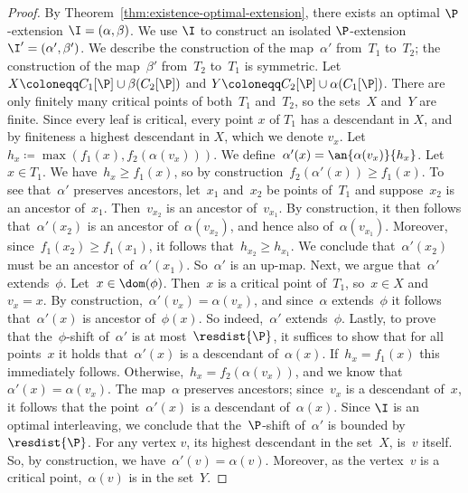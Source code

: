 \begin{proof}
By Theorem~\ref{thm:existence-optimal-extension}, there exists an optimal $\P$-extension $\I=(\alpha,\beta)$.
We use $\I$ to construct an isolated $\P$-extension $\I'=(\alpha',\beta')$.
We describe the construction of the map~$\alpha'$ from~$T_1$ to~$T_2$; the construction of the map~$\beta'$ from~$T_2$ to~$T_1$ is symmetric.
%
Let $X \coloneqq C_1[\P]\cup\beta(C_2[\P])$ and $Y \coloneqq C_2[\P] \cup \alpha(C_1[\P])$.
There are only finitely many critical points of both~$T_1$ and~$T_2$, so the sets~$X$ and~$Y$ are finite.
Since every leaf is critical, every point $x$ of $T_1$ has a descendant in $X$, and by finiteness a highest descendant in $X$, which we denote $v_x$.
Let~$h_x \coloneqq \max(f_1(x), f_2(\alpha(v_x)))$.
We define~$\alpha'(x) = \an{\alpha(v_x)}{h_x}$.
%
Let~$x \in T_1$.
We have~$h_x \ge f_1(x)$, so by construction~$f_2(\alpha'(x)) \ge f_1(x)$.
To see that~$\alpha'$ preserves ancestors, let~$x_1$ and~$x_2$ be points of~$T_1$ and suppose~$x_2$ is an ancestor of~$x_1$.
Then~$v_{x_2}$ is an ancestor of~$v_{x_1}$.
By construction, it then follows that~$\alpha'(x_2)$ is an ancestor of~$\alpha(v_{x_2})$, and hence also of~$\alpha(v_{x_1})$.
Moreover, since~$f_1(x_2) \ge f_1(x_1)$, it follows that~$h_{x_2} \ge h_{x_1}$.
We conclude that~$\alpha'(x_2)$ must be an ancestor of~$\alpha'(x_1)$.
So~$\alpha'$ is an up-map.
%
Next, we argue that~$\alpha'$ extends~$\phi$.
Let~$x \in \dom(\phi)$.
Then~$x$ is a critical point of~$T_1$, so~$x \in X$ and~$v_x = x$.
By construction,~$\alpha'(v_x) = \alpha(v_x)$, and since~$\alpha$ extends~$\phi$ it follows that~$\alpha'(x)$ is ancestor of~$\phi(x)$.
So indeed,~$\alpha'$ extends~$\phi$.
Lastly, to prove that the~$\phi$-shift of~$\alpha'$ is at most~$\resdist{\P}$, it suffices to show that for all points~$x$ it holds that~$\alpha'(x)$ is a descendant of~$\alpha(x)$.
If~$h_x = f_1(x)$ this immediately follows.
Otherwise,~$h_x = f_2(\alpha(v_x))$, and we know that~$\alpha'(x) = \alpha(v_x)$.
The map~$\alpha$ preserves ancestors; since~$v_x$ is a descendant of~$x$, it follows that the point~$\alpha'(x)$ is a descendant of~$\alpha(x)$.
Since $\I$ is an optimal interleaving, we conclude that the~$\P$-shift of~$\alpha'$ is bounded by~$\resdist{\P}$. 
%
For any vertex $v$, its highest descendant in the set~$X$, is~$v$ itself.
So, by construction, we have~$\alpha'(v) = \alpha(v)$.
Moreover, as the vertex~$v$ is a critical point,~$\alpha(v)$ is in the set~$Y$.

\end{proof}
